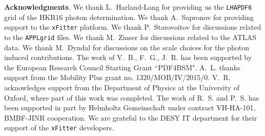 {\bf Acknowledgments}.
%
We thank L.~Harland-Lang for providing us the {\tt LHAPDF6} grid of
the HKR16 photon determination.
%
We thank A.~Sapronov for providing support to the {\tt xFitter} platform.
%
%
We thank P.~Starovoitov for discussions related to the {\tt APPLgrid} files.
%
We thank M.~Zinser for discussions related to the ATLAS data.
% 
We thank M.~Dyndal for discussions on the scale choices for the photon induced contributions.
%
The work of V.~B., F.~G., J.~R. has been supported by the European
Research Council Starting Grant ``PDF4BSM".
%
A.~L. thanks support from the Mobility Plus grant no. 1320/MOB/IV/2015/0.
%
V.~R. acknowledges support from the Department of Physics at the University of
Oxford, where part of this work was completed.
%
The work of R.~S. and P.~S. has been supported in part by Helmholtz Gemeinschaft
under contract VH-HA-101, BMBF-JINR cooperation.
%
We are grateful to the DESY IT department for their support of the {\tt xFitter} developers. 



